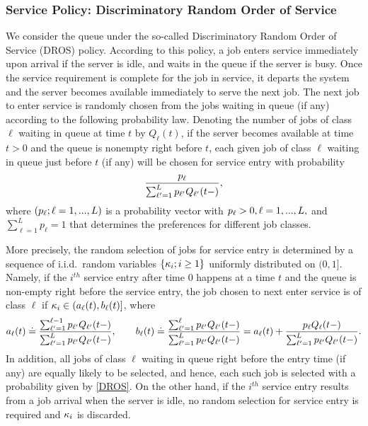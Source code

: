 \documentclass{article}
\theoremstyle{definition}
\numberwithin{equation}{section}
\begin{document}
\subsubsection*{Service Policy: Discriminatory Random Order of Service}
We consider the queue under the so-called Discriminatory Random Order of Service (DROS) policy. According to this policy, a job  enters service immediately upon arrival if the server is idle, and waits in the queue if the server is busy. Once the service requirement is complete for the job in service, it departs the system and the server becomes available immediately to serve the next job. The next job to enter service is randomly chosen from the jobs waiting in queue (if any) according to the following probability law. Denoting the number of jobs of class $\ell$ waiting in queue at time $t$ by $Q_\ell(t)$, if the server becomes available at time $t>0$ and the queue is nonempty right before $t$, each given job of class $\ell$ waiting in queue just before $t$ (if any) will be chosen for service entry with probability
\begin{equation}\label{DROS}
\frac{p_\ell}{\sum_{\ell'=1}^Lp_{\ell'}Q_{\ell'}(t-)},
\end{equation}
where $(p_\ell;\ell=1,...,L)$ is a probability vector with $p_\ell>0,\ell=1,...,L,$ and $\sum_{\ell=1}^Lp_{\ell}=1$ that determines the preferences for different job classes.

More precisely, the random selection of jobs for service entry is determined by a sequence of i.i.d.\ random variables $\{\kappa_i;i\geq1\}$ uniformly distributed on $(0,1]$. Namely, if the $i^{th}$ service entry after time $0$ happens at a time $t$ and the queue is non-empty right before the service entry, the job chosen to next enter service is of class $\ell$ if
$\kappa_i\in(a_\ell(t),b_\ell(t)]$, where
\begin{equation}\label{def_class_interval}
	a_\ell (t) \doteq \frac{\sum_{\ell'=1}^{\ell-1}p_{\ell'}Q_{\ell'}(t-)}{\sum_{\ell'=1}^{L}p_{\ell'}Q_{\ell'}(t-)},\quad\quad 	b_\ell (t)\doteq \frac{\sum_{\ell'=1}^{\ell}p_{\ell'}Q_{\ell'}(t-)}{\sum_{\ell'=1}^{L}p_{\ell'}Q_{\ell'}(t-)}= 	a_\ell (t)+ \frac{p_{\ell}Q_{\ell}(t-)}{\sum_{\ell'=1}^{L}p_{\ell'}Q_{\ell'}(t-)}.
\end{equation}
In addition, all jobs of class $\ell$ waiting in queue right before the entry time  (if any) are equally likely to be selected, and hence, each such job is selected with a probability given by \eqref{DROS}.  On the other hand, if the $i^{th}$ service entry results from a job arrival when the server is idle, no random selection for service entry is required and $\kappa_i$ is discarded.
\end{document}
